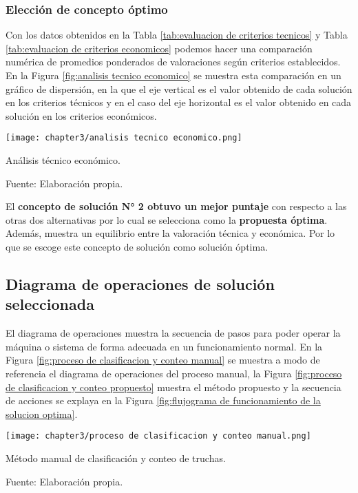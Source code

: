 \subsubsection{Elección de concepto óptimo}

Con los datos obtenidos en la Tabla \ref{tab:evaluacion de criterios tecnicos} y Tabla \ref{tab:evaluacion de criterios economicos} podemos hacer una comparación numérica de promedios ponderados de valoraciones según criterios establecidos. En la Figura \ref{fig:analisis tecnico economico} se muestra esta comparación en un gráfico de dispersión, en la que el eje vertical es el valor obtenido de cada solución en los criterios técnicos y en el caso del eje horizontal es el valor obtenido en cada solución en los criterios económicos.

\begin{myfigure}[H]
	\footnotesize\centering
	\texttt{[image: chapter3/analisis tecnico economico.png]}
	\caption{Análisis técnico económico.}
	\begin{myflushcenter}
		Fuente: Elaboración propia.
	\end{myflushcenter}
	\label{fig:analisis tecnico economico}
\end{myfigure}

El \textbf{concepto de solución N° 2 obtuvo un mejor puntaje} con respecto a las otras dos alternativas por lo cual se selecciona como la \textbf{propuesta óptima}. Además, muestra un equilibrio entre la valoración técnica y económica. Por lo que se escoge este concepto de solución como solución óptima.

\subsection{Diagrama de operaciones de solución seleccionada}

El diagrama de operaciones muestra la secuencia de pasos para poder operar la máquina o sistema de forma adecuada en un funcionamiento normal. En la Figura \ref{fig:proceso de clasificacion y conteo manual} se muestra a modo de referencia el diagrama de operaciones del proceso manual, la Figura \ref{fig:proceso de clasificacion y conteo propuesto} muestra el método propuesto y la secuencia de acciones se explaya en la Figura \ref{fig:flujograma de funcionamiento de la solucion optima}.

\newpage
\pagestyle{mylandscape}

\begin{landscape}
	\begin{myfigure}[H]
		\footnotesize\centering
		\texttt{[image: chapter3/proceso de clasificacion y conteo manual.png]}
		\caption{Método manual de clasificación y conteo de truchas.}
		\begin{myflushcenter}
			Fuente: Elaboración propia.
		\end{myflushcenter}
		\label{fig:proceso de clasificacion y conteo manual}
	\end{myfigure}
\end{landscape}

